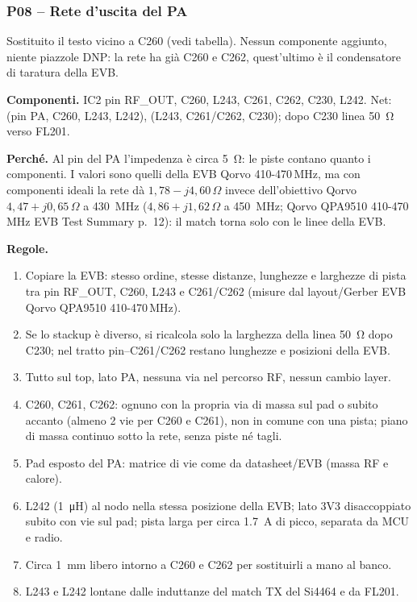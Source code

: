 \subsubsection{P08 -- Rete d'uscita del PA}
Sostituito il testo vicino a C260 (vedi tabella). Nessun componente aggiunto, niente piazzole DNP: la rete ha già C260 e C262, quest'ultimo è il condensatore di taratura della EVB.

\begin{tcolorbox}[enhanced,breakable,colback=boxcritbg,colframe=boxcrit,boxrule=1.2pt,left=7pt,right=6pt,top=4pt,bottom=4pt,
  title={\sffamily\bfseries Nota di layout L-01 \textendash{} Rete d'uscita del PA QPA9510 (IC2)},fonttitle=\normalsize,coltitle=white,colbacktitle=boxcrit]
\textbf{Componenti.} IC2 pin RF\_OUT, C260, L243, C261, C262, C230, L242. Net:  (pin PA, C260, L243, L242),  (L243, C261/C262, C230); dopo C230 linea \SI{50}{\ohm} verso FL201.

\textbf{Perché.} Al pin del PA l'impedenza è circa \SI{5}{\ohm}: le piste contano quanto i componenti. I valori sono quelli della EVB Qorvo 410-470\,MHz, ma con componenti ideali la rete dà $1{,}78 - j4{,}60\,\Omega$ invece dell'obiettivo Qorvo $4{,}47 + j0{,}65\,\Omega$ a \SI{430}{\mega\hertz} ($4{,}86 + j1{,}62\,\Omega$ a \SI{450}{\mega\hertz}; Qorvo QPA9510 410-470\,MHz EVB Test Summary p.\ 12): il match torna solo con le linee della EVB.

\textbf{Regole.}
\begin{enumerate}
\item Copiare la EVB: stesso ordine, stesse distanze, lunghezze e larghezze di pista tra pin RF\_OUT, C260, L243 e C261/C262 (misure dal layout/Gerber EVB Qorvo QPA9510 410-470\,MHz).
\item Se lo stackup è diverso, si ricalcola solo la larghezza della linea \SI{50}{\ohm} dopo C230; nel tratto pin--C261/C262 restano lunghezze e posizioni della EVB.
\item Tutto sul top, lato PA, nessuna via nel percorso RF, nessun cambio layer.
\item C260, C261, C262: ognuno con la propria via di massa sul pad o subito accanto (almeno 2 vie per C260 e C261), non in comune con una pista; piano di massa continuo sotto la rete, senza piste né tagli.
\item Pad esposto del PA: matrice di vie come da datasheet/EVB (massa RF e calore).
\item L242 (\SI{1}{\micro\henry}) al nodo  nella stessa posizione della EVB; lato 3V3 disaccoppiato subito con vie sul pad; pista larga per circa \SI{1.7}{A} di picco, separata da MCU e radio.
\item Circa \SI{1}{\milli\metre} libero intorno a C260 e C262 per sostituirli a mano al banco.
\item L243 e L242 lontane dalle induttanze del match TX del Si4464 e da FL201.
\end{enumerate}
\end{tcolorbox}

